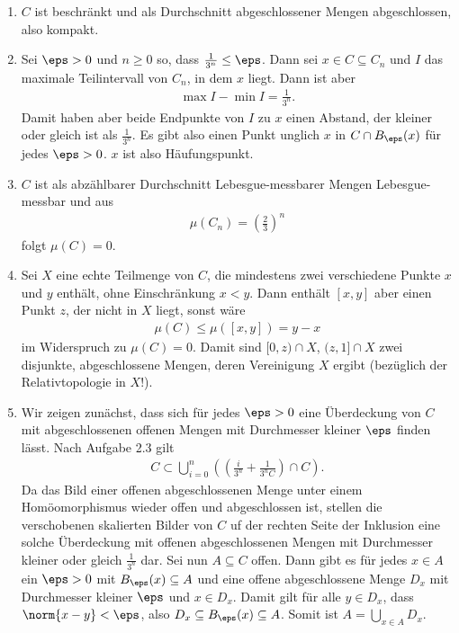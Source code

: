 \begin{beweis}
\renewcommand{\labelenumi}{(\alph{enumi})}
  \begin{enumerate}
  \item $C$ ist beschränkt und als Durchschnitt abgeschlossener Mengen abgeschlossen, also kompakt. 
  \item Sei $\eps >0$ und $n \geq 0$ so, dass $\frac 1 {3^n} \leq \eps$. Dann sei $x \in C \subseteq C_n$ und $I$ das maximale Teilintervall von $C_n$, in dem $x$ liegt. Dann ist aber 
    \begin{align*}
      \max I - \min I = \frac 1 {3^n}.
    \end{align*}
    Damit haben aber beide Endpunkte von $I$ zu $x$ einen Abstand, der kleiner  oder gleich ist als $ \frac 1 {3^n}$. Es gibt also einen Punkt unglich $x$ in $C \cap B_\eps(x)$ für jedes $\eps >0$. $x$ ist also Häufungspunkt.
  \item $C$ ist als abzählbarer Durchschnitt Lebesgue-messbarer Mengen Lebesgue-messbar und aus 
    \begin{align*}
      \mu(C_n) = \left(\frac 2 3\right)^n
    \end{align*}
    folgt $\mu(C) = 0$.
  \item Sei $X$ eine echte Teilmenge von $C$, die mindestens zwei verschiedene Punkte $x$ und $y$ enthält, ohne Einschränkung $x < y$. Dann enthält $[x, y]$ aber einen Punkt $z$, der nicht in $X$ liegt, sonst wäre
    \begin{align*}
      \mu(C)\leq \mu([x, y]) = y -x
    \end{align*}
    im Widerspruch zu $\mu(C) = 0$. Damit sind $[0, z) \cap X$, $(z, 1] \cap X$ zwei disjunkte, abgeschlossene Mengen, deren Vereinigung $X$ ergibt (bezüglich der Relativtopologie in $X$!). 
  \item Wir zeigen zunächst, dass sich für jedes $\eps > 0$ eine Überdeckung von $C$ mit abgeschlossenen offenen Mengen mit Durchmesser kleiner $\eps$ finden lässt. Nach Aufgabe 2.3 gilt 
    \begin{align*}
      C \subset \bigcup_{i = 0}^n\left( \left( \frac i {3^n} + \frac 1 {3^n C}\right) \cap C\right).
    \end{align*}
Da das Bild einer offenen abgeschlossenen Menge unter einem Homöomorphismus wieder offen und abgeschlossen ist, stellen die verschobenen skalierten Bilder von $C$ uf der rechten Seite der Inklusion eine solche Überdeckung mit offenen abgeschlossenen Mengen mit Durchmesser kleiner oder gleich $\frac 1 {3^n}$ dar. Sei nun $A \subseteq C$ offen. Dann gibt es für jedes $x \in A$ ein $\eps > 0$ mit $B_\eps(x) \subseteq A$ und eine offene abgeschlossene Menge $D_x$ mit Durchmesser kleiner $\eps$ und $x \in D_x$. Damit gilt für alle $y \in D_x$, dass $\norm{x - y} < \eps$, also $D_x \subseteq B_\eps(x) \subseteq A$. Somit ist $A= \bigcup_{x \in A} D_x$.
\end{enumerate}
\end{beweis}
